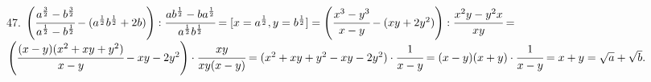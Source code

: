 47. $\left(\cfrac{a^{\frac{3}{2}}-b^{\frac{3}{2}}}{a^{\frac{1}{2}}-b^{\frac{1}{2}}}-(a^{\frac{1}{2}}b^{\frac{1}{2}}+2b)\right):\cfrac{ab^{\frac{1}{2}}-ba^{\frac{1}{2}}}{a^{\frac{1}{2}}b^{\frac{1}{2}}}=
[x=a^{\frac{1}{2}}, y=b^{\frac{1}{2}}]=
\left(\cfrac{x^3-y^3}{x-y}-(xy+2y^2)\right):\cfrac{x^2y-y^2x}{xy}=$\\$\left(\cfrac{(x-y)(x^2+xy+y^2)}{x-y}-xy-2y^2\right)\cdot\cfrac{xy}{xy(x-y)}=
(x^2+xy+y^2-xy-2y^2)\cdot\cfrac{1}{x-y}=(x-y)(x+y)\cdot\cfrac{1}{x-y}=x+y=\sqrt{a}+\sqrt{b}.$\\

